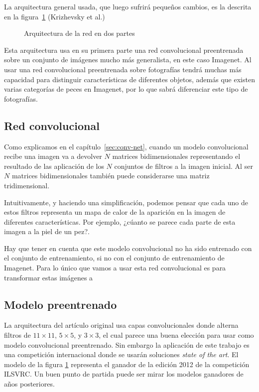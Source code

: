 La arquitectura general usada, que luego sufrirá pequeños cambios, es la descrita en la figura~\ref{general-architecture} (Krizhevsky et al.)

\begin{figure}
  \caption{Arquitectura de la red en dos partes}
\label{general-architecture}
\end{figure}

Esta arquitectura usa en su primera parte una red convolucional preentrenada sobre un conjunto de imágenes mucho más generalista, en este caso Imagenet. Al usar una red convolucional preentrenada sobre fotografías tendrá muchas más capacidad para distinguir características de diferentes objetos, además que existen varias categorías de peces en Imagenet, por lo que sabrá diferenciar este tipo de fotografías.


\subsection{Red convolucional}

Como explicamos en el capítulo~\ref{sec:conv-net}, cuando un modelo convolucional recibe una imagen va a devolver $N$ matrices bidimensionales representando el resultado de las aplicación de los $N$ conjuntos de filtros a la imagen inicial. Al ser $N$ matrices bidimensionales también puede considerarse una matriz tridimensional.

Intuitivamente, y haciendo una simplificación, podemos pensar que cada uno de estos filtros representa un mapa de calor de la aparición en la imagen de diferentes características. Por ejemplo, ¿cúanto se parece cada parte de esta imagen a la piel de un pez?.

Hay que tener en cuenta que este modelo convolucional no ha sido entrenado con el conjunto de entrenamiento, si no con el conjunto de entrenamiento de Imagenet. Para lo único que vamos a usar esta red convolucional es para transformar estas imágenes a 

\subsection{Modelo preentrenado}

La arquitectura del artículo original \parencite{krizhevsky2012imagenet} usa capas convolucionales donde alterna filtros de $11\times11$, $5\times5$, y $3\times3$, el cual parece una buena elección para usar como modelo convolucional preentrenado. Sin embargo la aplicación de este trabajo es una competición internacional donde se usarán soluciones \textit{state of the art}. El modelo de la figura \ref{general-architecture} representa el ganador de la edición 2012 de la competición ILSVRC. Un buen punto de partida puede ser mirar los modelos ganadores de años posteriores.

